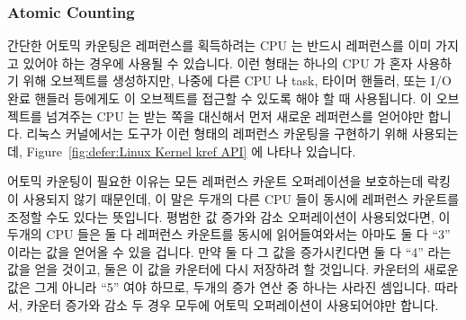 \subsubsection{Atomic Counting}
\label{sec:defer:Atomic Counting}

간단한 어토믹 카운팅은 레퍼런스를 획득하려는 CPU 는 반드시 레퍼런스를 이미
가지고 있어야 하는 경우에 사용될 수 있습니다.
이런 형태는 하나의 CPU 가 혼자 사용하기 위해 오브젝트를 생성하지만, 나중에 다른
CPU 나 task, 타이머 핸들러, 또는 I/O 완료 핸들러 등에게도 이 오브젝트를 접근할
수 있도록 해야 할 때 사용됩니다.
이 오브젝트를 넘겨주는 CPU 는 받는 쪽을 대신해서 먼저 새로운 레퍼런스를
얻어야만 합니다.
리눅스 커널에서는  도구가 이런 형태의 레퍼런스 카운팅을 구현하기 위해
사용되는데,
Figure~\ref{fig:defer:Linux Kernel kref API} 에 나타나 있습니다.

어토믹 카운팅이 필요한 이유는 모든 레퍼런스 카운트 오퍼레이션을 보호하는데
락킹이 사용되지 않기 때문인데, 이 말은 두개의 다른 CPU 들이 동시에 레퍼런스
카운트를 조정할 수도 있다는 뜻입니다.
평범한 값 증가와 감소 오퍼레이션이 사용되었다면, 이 두개의 CPU 들은 둘 다
레퍼런스 카운트를 동시에 읽어들여와서는 아마도 둘 다 ``3'' 이라는 값을 얻어올
수 있을 겁니다.
만약 둘 다 그 값을 증가시킨다면 둘 다 ``4'' 라는 값을 얻을 것이고, 둘은 이 값을
카운터에 다시 저장하려 할 것입니다.
카운터의 새로운 값은 그게 아니라 ``5'' 여야 하므로, 두개의 증가 연산 중 하나는
사라진 셈입니다.
따라서, 카운터 증가와 감소 두 경우 모두에 어토믹 오퍼레이션이 사용되어야만
합니다.

